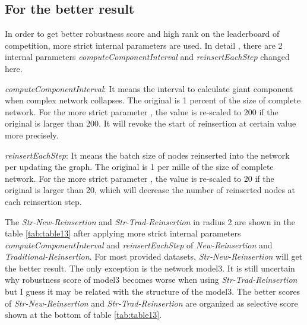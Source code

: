 \documentclass{article}
\begin{document}
	 
	 
	\subsection{For the better result}
	 

	In order to get better robustness score and high rank on the leaderboard of competition, more strict internal parameters are used. In detail , there are 2 internal parameters \textit{computeComponentInterval} and \textit{reinsertEachStep} changed here.
		
	\begin{enumerate}
		\begin{item}
			\textit{computeComponentInterval}: It means the interval to calculate giant component when complex network collapses. The original is 1 percent of the size of complete network. For the more strict parameter , the value is re-scaled to 200 if the original is larger than 200. It will revoke the start of reinsertion at certain value more precisely.
		\end{item}
		\begin{item}
			\textit{reinsertEachStep}: It means the batch size of nodes reinserted into the network per updating the graph. The original is 1 per mille of the size of complete network. For the more strict parameter , the value is re-scaled to 20 if the original is larger than 20, which will decrease the number of reinserted nodes at each reinsertion step.
		\end{item}		
		
	\end{enumerate}			
		
	The \textit{Str-New-Reinsertion} and \textit{Str-Trad-Reinsertion} in radius 2 are shown in the table \ref{tab:table13} after applying more strict internal parameters  \textit{computeComponentInterval} and \textit{reinsertEachStep} of \textit{New-Reinsertion} and \textit{Traditional-Reinsertion}. For most provided datasets, \textit{Str-New-Reinsertion} will get the better result. The only exception is the network model3. It is still uncertain why robustness score of model3 becomes worse when using \textit{Str-Trad-Reinsertion} but I guess it may be related with the structure of the model3. The better scores of \textit{Str-New-Reinsertion} and \textit{Str-Trad-Reinsertion} are organized as selective score shown at the bottom of table \ref{tab:table13}.
	 
\end{document}
